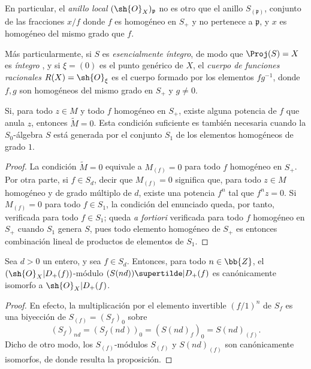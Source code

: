 \documentclass[oneside,10pt]{amsart}
\newcommand{\oldpage}[2][]{\marginnote{\normalfont\footnotesize\textbf{#1}~|~#2}\ignorespaces}
\let\EGAOriginalLabel\label
\renewcommand{\label}[1]{\phantomsection\EGAOriginalLabel{#1}}
\begin{document}
\oldpage[II]{32}
En particular, el \emph{anillo local} $(\sh{O}_X)_\mathfrak{p}$ no es otro que el anillo $S_{(\mathfrak{p})}$, conjunto de las fracciones $x/f$ donde $f$ es homogéneo en $S_+$ y no pertenece a $\mathfrak{p}$, y $x$ es homogéneo del mismo grado que $f$.

Más particularmente, si $S$ es \emph{esencialmente íntegro}, de modo que $\Proj(S)=X$ es \emph{íntegro} , y si $\xi=(0)$ es el punto genérico de $X$, el \emph{cuerpo de funciones racionales $R(X)=\sh{O}_\xi$} es el cuerpo formado por los elementos $fg^{-1}$, donde $f,g$ son homogéneos del mismo grado en $S_+$ y $g\neq0$.

\begin{proposition}[2.5.6]
\label{II.2.5.6}
Si, para todo $z\in M$ y todo $f$ homogéneo en $S_+$, existe alguna potencia de $f$ que anula $z$, entonces $\widetilde{M}=0$.
Esta condición suficiente es también necesaria cuando la $S_0$-álgebra $S$ está generada por el conjunto $S_1$ de los elementos homogéneos de grado $1$.
\end{proposition}

\begin{proof}
La condición $\widetilde{M}=0$ equivale a $M_{(f)}=0$ para todo $f$ homogéneo en $S_+$.
Por otra parte, si $f\in S_d$, decir que $M_{(f)}=0$ significa que, para todo $z\in M$ homogéneo y de grado múltiplo de $d$, existe una potencia $f^n$ tal que $f^nz=0$.
Si $M_{(f)}=0$ para todo $f\in S_1$, la condición del enunciado queda, por tanto, verificada para todo $f\in S_1$; queda \emph{a fortiori} verificada para todo $f$ homogéneo en $S_+$ cuando $S_1$ genera $S$, pues todo elemento homogéneo de $S_+$ es entonces combinación lineal de productos de elementos de $S_1$.
\end{proof}

\begin{proposition}[2.5.7]
\label{II.2.5.7}
Sea $d>0$ un entero, y sea $f\in S_d$.
Entonces, para todo $n\in\bb{Z}$, el $(\sh{O}_X|D_+(f))$-módulo $(S(nd))\supertilde|D_+(f)$ es canónicamente isomorfo a $\sh{O}_X|D_+(f)$.
\end{proposition}

\begin{proof}
En efecto, la multiplicación por el elemento invertible $(f/1)^n$ de $S_f$ es una biyección de $S_{(f)}=(S_f)_0$ sobre
\[
  (S_f)_{nd}=(S_f(nd))_0=(S(nd)_f)_0=S(nd)_{(f)}.
\]
Dicho de otro modo, los $S_{(f)}$-módulos $S_{(f)}$ y $S(nd)_{(f)}$ son canónicamente isomorfos, de donde resulta la proposición.
\end{proof}
\end{document}
